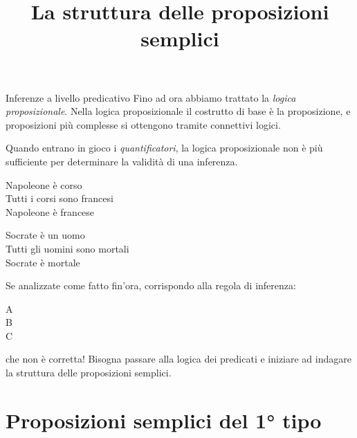 \documentclass[aspectratio=169,10pt,dvipsnames]{beamer}
\title{La struttura delle proposizioni semplici}
\begin{document}
\begin{frame}
\titlepage
\end{frame}

\begin{frame}{Inferenze a livello predicativo}
    Fino ad ora abbiamo trattato la \emph{logica proposizionale}. Nella logica proposizionale il costrutto di base è la proposizione, e proposizioni più complesse si ottengono tramite connettivi logici.

    \medskip
    Quando entrano in gioco i \emph{quantificatori}, la logica proposizionale non è più sufficiente per determinare la validità di una inferenza.

    \begin{center}
        \begin{inference}
            Napoleone è corso\\
            Tutti i corsi sono francesi\\
            \hline
            Napoleone è francese
        \end{inference}
        \qquad
        \begin{inference}
            Socrate è un uomo\\
            Tutti gli uomini sono mortali\\
            \hline
            Socrate è mortale
        \end{inference}
    \end{center}
    Se analizzate come fatto fin'ora, corrispondo alla regola di inferenza:
    \begin{center}
        \begin{inference}
            A\\
            B\\
            \hline
            C
        \end{inference}
    \end{center}
    che non è corretta! Bisogna passare alla \alert{logica dei predicati} e iniziare ad indagare la \alert{struttura delle proposizioni semplici}.
\end{frame}

\section{Proposizioni semplici del 1° tipo}
\end{document}
